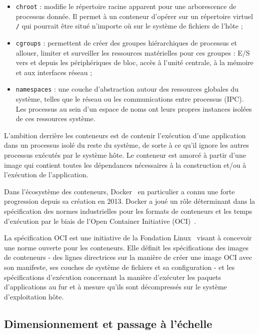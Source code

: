 \begin{itemize}
    \item \texttt{chroot} : modifie le répertoire racine apparent pour une arborescence de processus donnée. Il permet à un conteneur d'opérer sur un répertoire virtuel \texttt{/} qui pourrait être situé n'importe où sur le système de fichiers de l'hôte ;
    \item \texttt{cgroups} : permettent de créer des groupes hiérarchiques de processus et allouer, limiter et surveiller les ressources matérielles pour ces groupes : E/S vers et depuis les périphériques de bloc, accès à l'unité centrale, à la mémoire et aux interfaces réseau ;
    \item \texttt{namespaces} : une couche d'abstraction autour des ressources globales du système, telles que le réseau ou les communications entre processus (IPC). Les processus au sein d'un espace de noms ont leurs propres instances isolées de ces ressources système.
\end{itemize}

L'ambition derrière les conteneurs est de contenir l'exécution d'une application dans un processus isolé du reste du système, de sorte à ce qu'il ignore les autres processus exécutés par le système hôte. Le conteneur est amorcé à partir d'une image qui contient toutes les dépendances nécessaires à la construction et/ou à l'exécution de l'application.

Dans l'écosystème des conteneurs, Docker~\cite{docker} en particulier a connu une forte progression depuis sa création en 2013. Docker a joué un rôle déterminant dans la spécification des normes industrielles pour les formats de conteneurs et les temps d'exécution par le biais de l'Open Container Initiative (OCI)~\cite{oci}.

La spécification OCI est une initiative de la Fondation Linux~\cite{linuxfoundation} visant à concevoir une norme ouverte pour les conteneurs. Elle définit les spécifications des images de conteneurs - des lignes directrices sur la manière de créer une image OCI avec son manifeste, ses couches de système de fichiers et sa configuration - et les spécifications d'exécution concernant la manière d'exécuter les paquets d'applications au fur et à mesure qu'ils sont décompressés sur le système d'exploitation hôte.

\subsection{Dimensionnement et passage à l'échelle}


